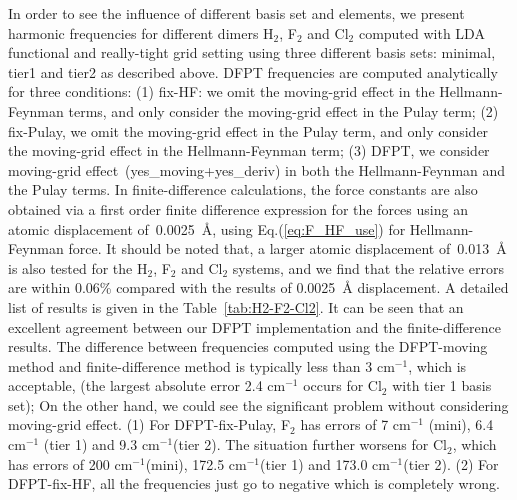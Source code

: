 \documentclass[journal=jpca,manuscript=article]{achemso}
\begin{document}
In order to see the influence of different basis set and elements, we present
harmonic frequencies for different dimers H$_2$, F$_2$ and Cl$_2$ computed with
LDA functional and really-tight grid setting using three different basis sets: minimal, tier1 and tier2 as described above. DFPT frequencies are computed analytically for three conditions:
(1) fix-HF: we omit the moving-grid effect in the Hellmann-Feynman terms, and only consider the moving-grid effect in the Pulay term; (2) fix-Pulay, we omit the moving-grid effect in the Pulay term, and only consider the moving-grid effect in the Hellmann-Feynman term; (3) DFPT, we consider
moving-grid effect~(yes\_moving+yes\_deriv) in both the Hellmann-Feynman and the Pulay terms. In finite-difference calculations, the force constants are also obtained via a first order finite difference expression for the forces using an atomic displacement of~0.0025~{\AA}, using Eq.(\ref{eq:F_HF_use}) for Hellmann-Feynman force.  It should be noted that, a larger atomic displacement of~0.013~{\AA} is also tested for the H$_2$, F$_2$ and Cl$_2$ systems, and we find that the relative errors are within 0.06\% compared with the results of 0.0025~{\AA} displacement.  A detailed list of results is given in the Table~\ref{tab:H2-F2-Cl2}. It can be seen that an excellent agreement between our DFPT implementation and the finite-difference results. The difference between frequencies computed using the DFPT-moving method and finite-difference method is typically less than 3 cm$^{-1}$, which is acceptable, (the largest absolute error 2.4 cm$^{-1}$ occurs for Cl$_2$ with tier 1 basis set); On the other hand, we could see the significant problem without considering moving-grid effect. (1) For DFPT-fix-Pulay, F$_2$ has errors of 7 cm$^{-1}$ (mini), 6.4 cm$^{-1}$ (tier 1) and 9.3 cm$^{-1}$(tier 2). The situation further worsens for 
Cl$_2$, which has errors of 200 cm$^{-1}$(mini),  172.5 cm$^{-1}$(tier 1) and 173.0 cm$^{-1}$(tier 2).  (2) For DFPT-fix-HF, all the frequencies just go to negative which is completely wrong. 
\end{document}
